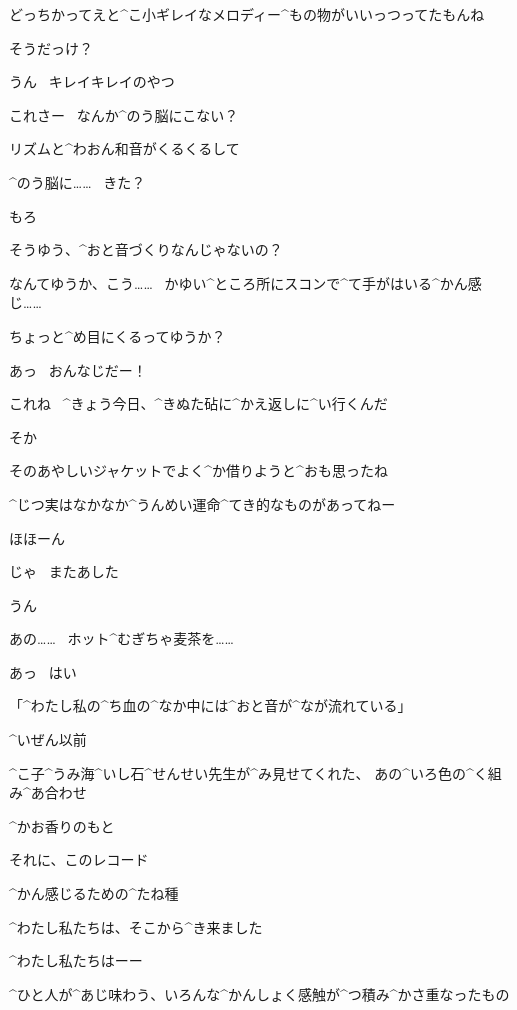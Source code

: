 \Shiba どっちかってえと^{こ}{小}ギレイなメロディー^{もの}{物}がいいっつってたもんね

\Kokone そうだっけ？

\Shiba うん
\ キレイキレイのやつ

\page[76]
\Shiba これさー
\ なんか^{のう}{脳}にこない？

\Shiba リズムと^{わおん}{和音}がくるくるして

\Kokone ^{のう}{脳}に……
\ きた？

\Shiba もろ

\Shiba そうゆう、^{おと}{音}づくりなんじゃないの？

\Shiba なんてゆうか、こう……
\ かゆい^{ところ}{所}にスコンで^{て}{手}がはいる^{かん}{感}じ……

\Shiba ちょっと^{め}{目}にくるってゆうか？

\Kokone あっ
\ おんなじだー！

\page[77]
\Kokone これね
\ ^{きょう}{今日}、^{きぬた}{砧}に^{かえ}{返}しに^{い}{行}くんだ

\Shiba そか

\Shiba そのあやしいジャケットでよく^{か}{借}りようと^{おも}{思}ったね

\Kokone ^{じつ}{実}はなかなか^{うんめい}{運命}^{てき}{的}なものがあってねー

\Shiba ほほーん

\page[78]
\Shiba じゃ
\ またあした

\Kokone うん

\page[79]
\Kokone あの……
\ ホット^{むぎちゃ}{麦茶}を……

\Person あっ
\ はい

\page[82]
\Kokone 「^{わたし}{私}の^{ち}{血}の^{なか}{中}には^{おと}{音}が^{なが}{流}れている」

\page[83]
\Kokone ^{いぜん}{以前}

\Kokone ^{こ}{子}^{うみ}{海}^{いし}{石}^{せんせい}{先生}が^{み}{見}せてくれた、
あの^{いろ}{色}の^{く}{組}み^{あ}{合}わせ

\Kokone ^{かお}{香}りのもと

\Kokone それに、このレコード

\Kokone ^{かん}{感}じるための^{たね}{種}

\page[84]
\Kokone ^{わたし}{私}たちは、そこから^{き}{来}ました

\Kokone ^{わたし}{私}たちはーー

\Kokone ^{ひと}{人}が^{あじ}{味}わう、いろんな^{かんしょく}{感触}が^{つ}{積}み^{かさ}{重}なったもの

